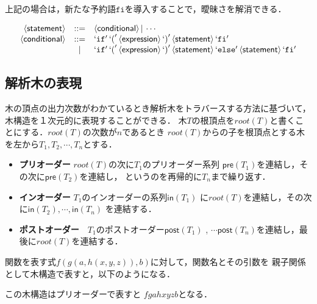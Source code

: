 \documentclass[dvipdfmx,a4j]{jbook}
\begin{document}
上記の場合は，新たな予約語$\mathtt{fi}$を導入することで，曖昧さを解消できる．

\[\begin{array}{rcl}
  \langle{\mbox{$\mathsf{statement}$}}\rangle & \mathtt{::=} & \langle{\mbox{$\mathsf{conditional}$}}\rangle\,|\, \cdots\\
  \langle{\mbox{$\mathsf{conditional}$}}\rangle & \mathtt{::=} & `\mbox{$\mathtt{if}$}'\,`\mbox{$\mathtt{(}$}'\,\langle{\mbox{$\mathsf{expression}$}}\rangle\,`\mbox{$\mathtt{)}$}'\,\langle{\mbox{$\mathsf{statement}$}}\rangle\,`\mbox{$\mathtt{fi}$}'\\
  & | & `\mbox{$\mathtt{if}$}'\,`\mbox{$\mathtt{(}$}'\,\langle{\mbox{$\mathsf{expression}$}}\rangle\,`\mbox{$\mathtt{)}$}'\,\langle{\mbox{$\mathsf{statement}$}}\rangle\,`\mbox{$\mathtt{else}$}'\,\langle{\mbox{$\mathsf{statement}$}}\rangle\,`\mbox{$\mathtt{fi}$}'
\end{array}\]

\subsection{解析木の表現}

木の頂点の出力次数がわかているとき解析木をトラバースする方法に基づいて，
木構造を１次元的に表現することができる．
木$T$の根頂点を$root(T)$と書くことにする．$root(T)$の次数が$n$であるとき
$root(T)$からの子を根頂点とする木を左から$T_1,T_2,\cdots,T_n$とする．

\begin{itemize}
  \item {\bf プリオーダー} $root(T)$の次に$T_1$のプリオーダー系列
  $\mathsf{pre}(T_1)$を連結し，その次に$\mathsf{pre}(T_2)$を連結し，
  というのを再帰的に$T_n$まで繰り返す．
  \item {\bf インオーダー} $T_1$のインオーダーの系列$\mathsf{in}(T_1)$
  に$root(T)$を連結し，その次に$\mathsf{in}(T_2), \cdots, \mathsf{in}(T_n)$
  を連結する．
  \item {\bf ポストオーダー}　$T_1$のポストオーダー$\mathsf{post}(T_1)$
  , $\cdots \mathsf{post}(T_n)$を連結し，最後に$root(T)$を連結する．
\end{itemize}

関数を表す式$f(g(a,h(x,y,z)),b)$に対して，関数名とその引数を
親子関係として木構造で表すと，以下のようになる．

この木構造はプリオーダーで表すと $fgahxyzb$となる．
\end{document}
